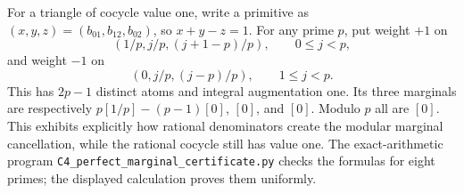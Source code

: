 \begin{example}
\label{C4:triangle-distribution}
For a triangle of cocycle value one, write a primitive as
$(x,y,z)=(b_{01},b_{12},b_{02})$, so $x+y-z=1$.
For any prime $p$, put weight $+1$ on
\[
 (1/p,j/p,(j+1-p)/p),\qquad 0\leq j<p,
\]
and weight $-1$ on
\[
 (0,j/p,(j-p)/p),\qquad 1\leq j<p.
\]
This has $2p-1$ distinct atoms and integral augmentation one. Its
three marginals are respectively
$p[1/p]-(p-1)[0]$, $[0]$, and $[0]$.
Modulo $p$ all are $[0]$. This exhibits explicitly how rational
denominators create the modular marginal cancellation, while the
rational cocycle still has value one. The exact-arithmetic program
\texttt{C4\_perfect\_marginal\_certificate.py} checks the formulas
for eight primes; the displayed calculation proves them uniformly.
\end{example}

